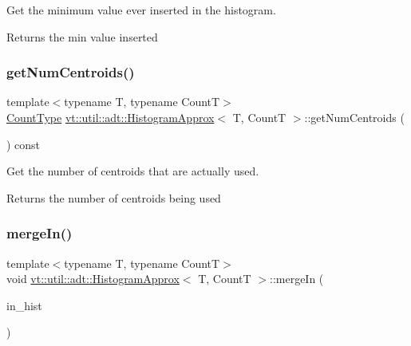 Get the minimum value ever inserted in the histogram. 

\begin{DoxyReturn}{Returns}
the min value inserted 
\end{DoxyReturn}
\mbox{\label{structvt_1_1util_1_1adt_1_1_histogram_approx_acdc73bd403084f66fc7d6011e4853ff6}} 
\subsubsection{\texorpdfstring{get\+Num\+Centroids()}{getNumCentroids()}}
{\footnotesize\ttfamily template$<$typename T, typename CountT$>$ \\
\hyperlink{structvt_1_1util_1_1adt_1_1_histogram_approx_aa2fb74665588d311da76dd821f2912c6}{Count\+Type} \hyperlink{structvt_1_1util_1_1adt_1_1_histogram_approx}{vt\+::util\+::adt\+::\+Histogram\+Approx}$<$ T, CountT $>$\+::get\+Num\+Centroids (\begin{DoxyParamCaption}{ }\end{DoxyParamCaption}) const\hspace{0.3cm}{\ttfamily [inline]}}



Get the number of centroids that are actually used. 

\begin{DoxyReturn}{Returns}
the number of centroids being used 
\end{DoxyReturn}
\mbox{\label{structvt_1_1util_1_1adt_1_1_histogram_approx_af3a3a4065892e90e346fdfbf6060dc9c}} 
\subsubsection{\texorpdfstring{merge\+In()}{mergeIn()}}
{\footnotesize\ttfamily template$<$typename T, typename CountT$>$ \\
void \hyperlink{structvt_1_1util_1_1adt_1_1_histogram_approx}{vt\+::util\+::adt\+::\+Histogram\+Approx}$<$ T, CountT $>$\+::merge\+In (\begin{DoxyParamCaption}\item[{\hyperlink{structvt_1_1util_1_1adt_1_1_histogram_approx}{Histogram\+Approx}$<$ T, \hyperlink{structvt_1_1util_1_1adt_1_1_histogram_approx_aa2fb74665588d311da76dd821f2912c6}{Count\+Type} $>$ const \&}]{in\+\_\+hist }\end{DoxyParamCaption})\hspace{0.3cm}{\ttfamily [inline]}}



